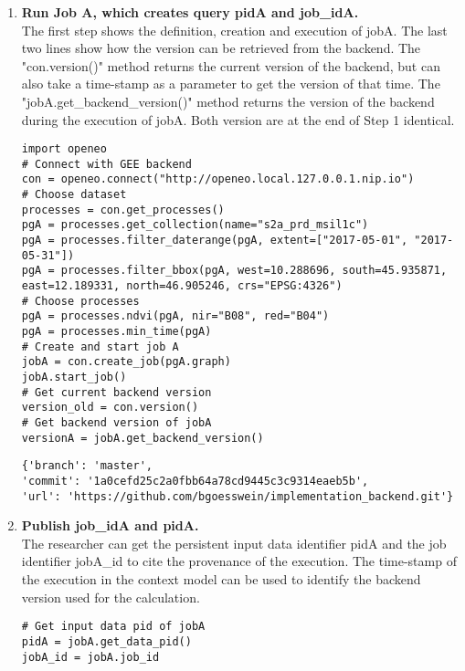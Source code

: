 \documentclass[draft,final]{vutinfth} %
\newenvironment{code}{\captionsetup{type=listing}}{}
\begin{document}
\begin{enumerate}
	\item \textbf{Run Job A, which creates query pidA and job\_idA.} \\
	The first step shows the definition, creation and execution of jobA. The last two lines show how the version can be retrieved from the backend. The "con.version()" method returns the current version of the backend, but can also take a time-stamp as a parameter to get the version of that time. The "jobA.get\_backend\_version()" method returns the version of the backend during the execution of jobA. Both version are at the end of Step 1 identical. 
	\begin{code}
		\begin{verbatim}
import openeo
# Connect with GEE backend
con = openeo.connect("http://openeo.local.127.0.0.1.nip.io")
# Choose dataset
processes = con.get_processes()
pgA = processes.get_collection(name="s2a_prd_msil1c")
pgA = processes.filter_daterange(pgA, extent=["2017-05-01", "2017-05-31"])
pgA = processes.filter_bbox(pgA, west=10.288696, south=45.935871, 
east=12.189331, north=46.905246, crs="EPSG:4326")
# Choose processes
pgA = processes.ndvi(pgA, nir="B08", red="B04")
pgA = processes.min_time(pgA)
# Create and start job A
jobA = con.create_job(pgA.graph)
jobA.start_job()
# Get current backend version
version_old = con.version()
# Get backend version of jobA 
versionA = jobA.get_backend_version()
		\end{verbatim}
		\caption{Step 1: Researcher runs Job A and gets the used backend version.}
		\label{lst:eva_jobcapture_1}
	\end{code}
	
	\begin{code}
		\begin{verbatim}
{'branch': 'master',
'commit': '1a0cefd25c2a0fbb64a78cd9445c3c9314eaeb5b',
'url': 'https://github.com/bgoesswein/implementation_backend.git'}
		\end{verbatim}
		\caption{Step 1: Version of the jobA execution version\_old.}
		\label{lst:eva_jobcapture_1_1}
	\end{code} 
	
	\item \textbf{Publish job\_idA and pidA.} \\
	The researcher can get the persistent input data identifier pidA and the job identifier jobA\_id to cite the provenance of the execution. The time-stamp of the execution in the context model can be used to identify the backend version used for the calculation.
	\begin{code}
		\begin{verbatim}
# Get input data pid of jobA 
pidA = jobA.get_data_pid()
jobA_id = jobA.job_id
		\end{verbatim}
		\caption{Researcher gets the input data PID of jobA and the job\_id of jobA.}
		\label{lst:eva_jobcapture_2}
	\end{code}
	

\end{enumerate}
\end{document}
